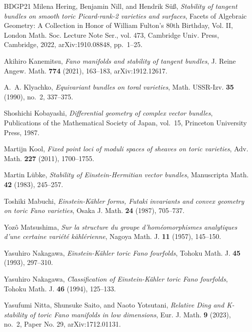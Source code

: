 \documentclass[11pt]{amsart}
\theoremstyle{definition}
\theoremstyle{remark}
\begin{document}
\begin{thebibliography}{BDGP21}
Milena Hering, Benjamin Nill, and Hendrik S\"u\ss, \emph{Stability of tangent
  bundles on smooth toric {P}icard-rank-2 varieties and surfaces}, Facets of
  Algebraic Geometry: A Collection in Honor of William Fulton's 80th Birthday,
  Vol. II, London Math. Soc. Lecture Note Ser., vol. 473, Cambridge Univ.
  Press, Cambridge, 2022, arXiv:1910.08848, pp.~1--25.

Akihiro Kanemitsu, \emph{{F}ano manifolds and stability of tangent bundles}, J.
  Reine Angew. Math. \textbf{774} (2021), 163--183, arXiv:1912.12617.

A.~A. Klyachko, \emph{Equivariant bundles on toral varieties}, Math. USSR-Izv.
  \textbf{35} (1990), no.~2, 337--375.

Shoshichi Kobayashi, \emph{Differential geometry of complex vector bundles},
  Publications of the Mathematical Society of Japan, vol.~15, Princeton
  University Press, 1987.

Martijn Kool, \emph{Fixed point loci of moduli spaces of sheaves on toric
  varieties}, Adv. Math. \textbf{227} (2011), 1700--1755.

Martin L{\"u}bke, \emph{Stability of {E}instein-{H}ermitian vector bundles},
  Manuscripta Math. \textbf{42} (1983), 245--257.

Toshiki Mabuchi, \emph{{E}instein-{K}\"ahler forms, {F}utaki invariants and
  convex geometry on toric {F}ano varieties}, Osaka J. Math. \textbf{24}
  (1987), 705--737.

Yoz\^o Matsushima, \emph{Sur la structure du groupe d'hom\'eomorphismes
  analytiques d'une certaine vari\'et\'e k\"ahl\'erienne}, Nagoya Math. J.
  \textbf{11} (1957), 145--150.

Yasuhiro Nakagawa, \emph{{E}instein-{K}\"ahler toric {F}ano fourfolds}, Tohoku
  Math. J. \textbf{45} (1993), 297--310.

Yasuhiro Nakagawa, \emph{Classification of {E}instein-{K}\"ahler toric {F}ano
  fourfolds},
  Tohoku Math. J. \textbf{46} (1994), 125--133.

Yasufumi Nitta, Shunsuke Saito, and Naoto Yotsutani, \emph{Relative {D}ing and
  {K}-stability of toric {F}ano manifolds in low dimensions}, Eur. J. Math.
  \textbf{9} (2023), no.~2, Paper No. 29, arXiv:1712.01131.


\end{thebibliography}
\end{document}
